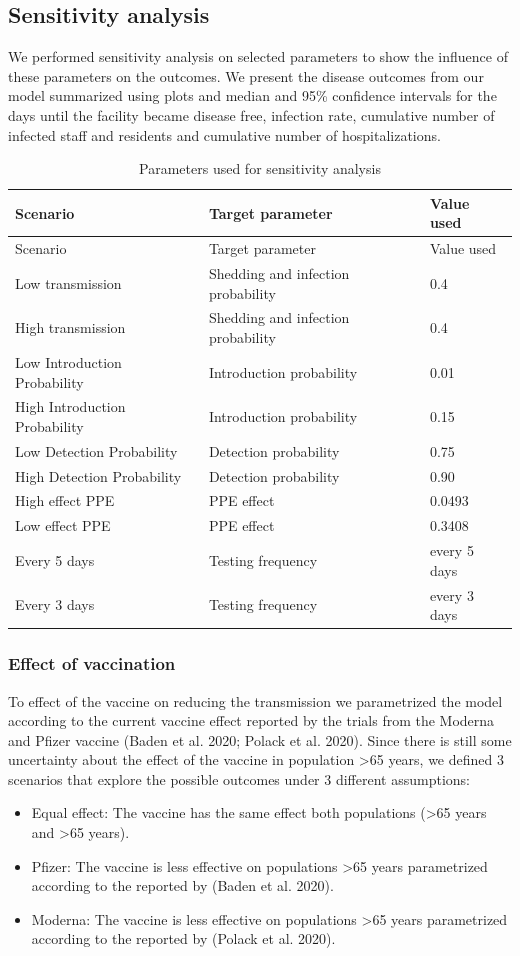\documentclass[
]{article}
\providecommand{\tightlist}{%
  \setlength{\itemsep}{0pt}\setlength{\parskip}{0pt}}
\begin{document}
\hypertarget{sensitivity-analysis}{%
\subsection{Sensitivity analysis}\label{sensitivity-analysis}}

We performed sensitivity analysis on selected parameters to show the
influence of these parameters on the outcomes. We present the disease
outcomes from our model summarized using plots and median and 95\%
confidence intervals for the days until the facility became disease
free, infection rate, cumulative number of infected staff and residents
and cumulative number of hospitalizations.

\begin{longtable}[]{@{}lll@{}}
\caption{Parameters used for sensitivity analysis}\tabularnewline
\toprule
Scenario & Target parameter & Value used\tabularnewline
\midrule
\endfirsthead
\toprule
Scenario & Target parameter & Value used\tabularnewline
\midrule
\endhead
Low transmission & Shedding and infection probability &
0.4\tabularnewline
High transmission & Shedding and infection probability &
0.4\tabularnewline
Low Introduction Probability & Introduction probability &
0.01\tabularnewline
High Introduction Probability & Introduction probability &
0.15\tabularnewline
Low Detection Probability & Detection probability & 0.75\tabularnewline
High Detection Probability & Detection probability & 0.90\tabularnewline
High effect PPE & PPE effect & 0.0493\tabularnewline
Low effect PPE & PPE effect & 0.3408\tabularnewline
Every 5 days & Testing frequency & every 5 days\tabularnewline
Every 3 days & Testing frequency & every 3 days\tabularnewline
\bottomrule
\end{longtable}

\hypertarget{effect-of-vaccination}{%
\subsubsection{Effect of vaccination}\label{effect-of-vaccination}}

To effect of the vaccine on reducing the transmission we parametrized
the model according to the current vaccine effect reported by the trials
from the Moderna and Pfizer vaccine (Baden et al. 2020; Polack et al.
2020). Since there is still some uncertainty about the effect of the
vaccine in population \textgreater65 years, we defined 3 scenarios that
explore the possible outcomes under 3 different assumptions:

\begin{itemize}
\tightlist
\item
  Equal effect: The vaccine has the same effect both populations
  (\textgreater65 years and \textgreater65 years).
\item
  Pfizer: The vaccine is less effective on populations \textgreater65
  years parametrized according to the reported by (Baden et al. 2020).
\item
  Moderna: The vaccine is less effective on populations \textgreater65
  years parametrized according to the reported by (Polack et al. 2020).
\end{itemize}
\end{document}
